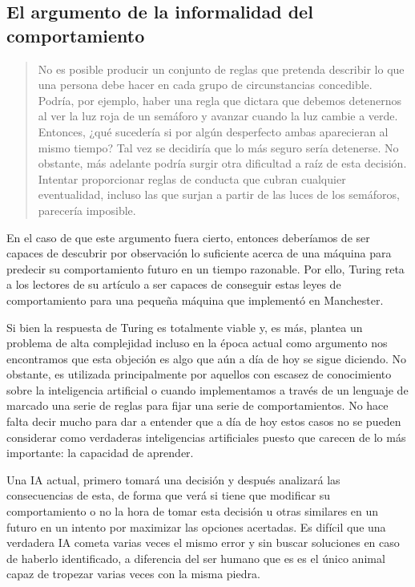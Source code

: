 \documentclass[12pt,a4paper]{article}
\begin{document}
\subsection{El argumento de la informalidad del comportamiento}
\begin{quote}\small No es posible producir un conjunto de reglas que pretenda describir lo que una persona debe hacer en cada grupo de circunstancias concedible. Podría, por ejemplo, haber una regla que dictara que debemos detenernos al ver la luz roja de un semáforo y avanzar cuando la luz cambie a verde. Entonces, ¿qué sucedería si por algún desperfecto ambas aparecieran al mismo tiempo? Tal vez se decidiría que lo más seguro sería detenerse. No obstante, más adelante podría surgir otra dificultad a raíz de esta decisión. Intentar proporcionar reglas de conducta que cubran cualquier eventualidad, incluso las que surjan a partir de las luces de los semáforos, parecería imposible.
\end{quote}

En el caso de que este argumento fuera cierto, entonces deberíamos de ser capaces de descubrir por observación lo suficiente acerca de una máquina para predecir su comportamiento futuro en un tiempo razonable. Por ello, Turing reta a los lectores de su artículo a ser capaces de conseguir estas leyes de comportamiento para una pequeña máquina que implementó en Manchester.

Si bien la respuesta de Turing es totalmente viable y, es más, plantea un problema de alta complejidad incluso en la época actual como argumento nos encontramos que esta objeción es algo que aún a día de hoy se sigue diciendo. No obstante, es utilizada principalmente por aquellos con escasez de conocimiento sobre la inteligencia artificial o cuando implementamos a través de un lenguaje de marcado una serie de reglas para fijar una serie de comportamientos. No hace falta decir mucho para dar a entender que a día de hoy estos casos no se pueden considerar como verdaderas inteligencias artificiales puesto que carecen de lo más importante: la capacidad de aprender.

Una IA actual, primero tomará una decisión y después analizará las consecuencias de esta, de forma que verá si tiene que modificar su comportamiento o no la hora de tomar esta decisión u otras similares en un futuro en un intento por maximizar las opciones acertadas. Es difícil que una verdadera IA cometa varias veces el mismo error y sin buscar soluciones en caso de haberlo identificado, a diferencia del ser humano que es es el único animal capaz de tropezar varias veces con la misma piedra.
\end{document}
